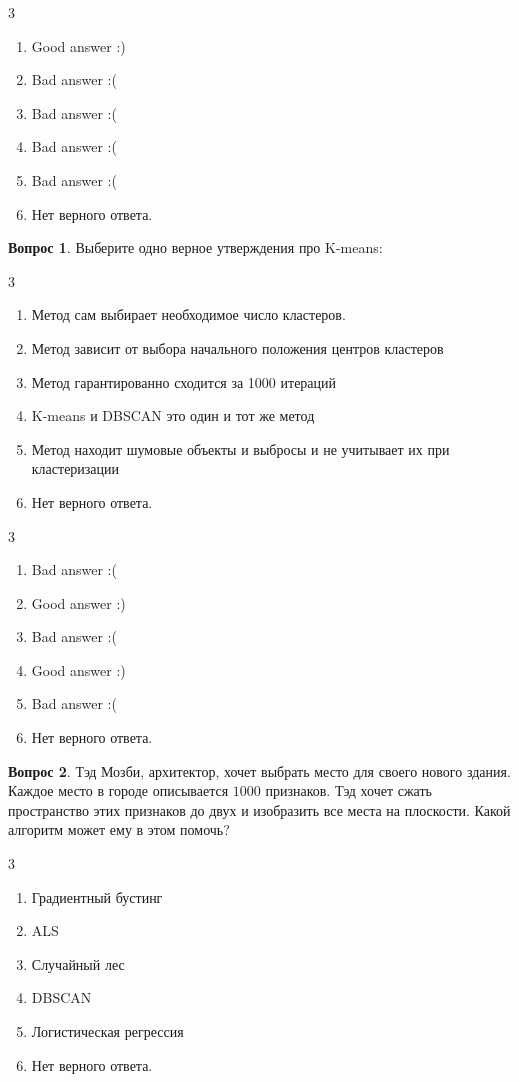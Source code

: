\documentclass[12pt]{article}
\newenvironment{answerlist}[1][3]{
\begin{multicols}{#1}

\begin{enumerate}[label=\fbox{\emph{\Alph*}},ref=\emph{\alph*}]
}
{
\item Нет верного ответа.
\end{enumerate}
\end{multicols}
}
\theoremstyle{definition}
\newtheorem{question}{Вопрос}
\begin{document}
\begin{solution}
\begin{answerlist}
  \item Good answer :)
  \item Bad answer :(
  \item Bad answer :(
  \item Bad answer :(
  \item Bad answer :(
\end{answerlist}
\end{solution}

\newpage 

\begin{question}
Выберите одно верное утверждения про K-means:
\begin{answerlist}
  \item  Метод сам выбирает необходимое число кластеров.
  \item  Метод зависит от выбора начального положения центров кластеров
  \item  Метод гарантированно сходится за 1000 итераций
  \item  K-means и DBSCAN это один и тот же метод
  \item  Метод находит шумовые объекты и выбросы и не учитывает их при кластеризации
\end{answerlist}
\end{question}

\begin{solution}
\begin{answerlist}
  \item Bad answer :(
  \item Good answer :)
  \item Bad answer :(
  \item Good answer :)
  \item Bad answer :(
\end{answerlist}
\end{solution}


\begin{question}
Тэд Мозби, архитектор, хочет выбрать место для своего нового здания. Каждое место в городе описывается $1000$ признаков. Тэд хочет сжать пространство этих признаков до двух и изобразить все места на плоскости. Какой алгоритм может ему в этом помочь? 
\begin{answerlist}
  \item  Градиентный бустинг
  \item  ALS
  \item  Случайный лес
  \item  DBSCAN
  \item  Логистическая регрессия
\end{answerlist}
\end{question}
\end{document}
